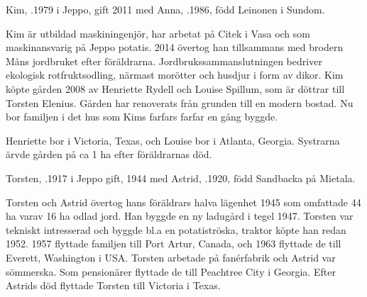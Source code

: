 


Kim, .1979 i Jeppo, gift 2011 med Anna, .1986, född Leinonen i  Sundom.
\begin{jhchildren}
  \item {}
  \item {}
  \item {}
\end{jhchildren}

Kim är utbildad maskiningenjör, har arbetat på Citek i Vasa och som maskinansvarig på Jeppo potatis. 2014 övertog han tillsammans med brodern Måns jordbruket efter föräldrarna. Jordbrukssammanslutningen bedriver ekologisk rotfruktsodling, 	närmast morötter och husdjur i form av dikor. Kim köpte gården 2008 av Henriette Rydell och Louise Spillum, som är döttrar till Torsten Elenius. Gården har renoverats från grunden till en modern bostad. Nu bor familjen i det hus som Kims farfars farfar en gång byggde.


Henriette bor i Victoria, Texas, och Louise bor i Atlanta, Georgia. Systrarna ärvde gården på ca 1 ha efter föräldrarnas död.\jhvspace{}


Torsten, .1917 i Jeppo gift, 1944 med Astrid, .1920, född Sandbacka på Mietala.
\begin{jhchildren}
  \item {}
  \item {}
\end{jhchildren}
Torsten och Astrid övertog hans föräldrars halva lägenhet 1945 som 	omfattade 44 ha varav 16 ha odlad jord. Han byggde en ny ladugård i tegel 1947. Torsten var tekniskt intresserad och byggde bl.a en potatiströska, traktor köpte han redan 1952. 1957 flyttade familjen till Port Artur, Canada, och 1963 flyttade de till Everett, Washington i USA. Torsten arbetade på fanérfabrik och Astrid var sömmerska. Som pensionärer flyttade de till Peachtree City i Georgia. Efter Astrids död flyttade Torsten till Victoria i Texas.


